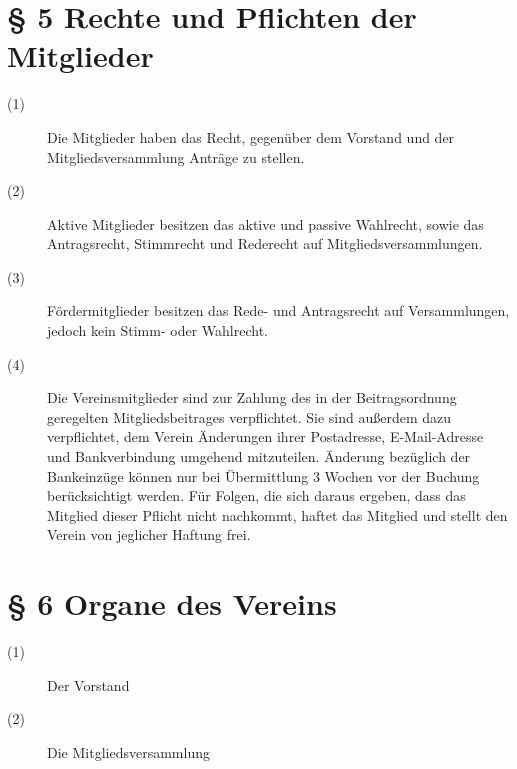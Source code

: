 \documentclass[a4paper,12pt]{scrartcl}
\begin{document}
\section*{\S{} 5 Rechte und Pflichten der Mitglieder}
\begin{description} 

\item[(1)] Die Mitglieder haben das Recht, gegenüber dem Vorstand und der Mitgliedsversammlung Anträge zu stellen.
\item[(2)] Aktive Mitglieder besitzen das aktive und passive Wahlrecht, sowie das Antragsrecht, Stimmrecht und Rederecht auf Mitgliedsversammlungen.
\item[(3)] Fördermitglieder besitzen das Rede- und Antragsrecht auf Versammlungen, jedoch kein Stimm- oder Wahlrecht.
\item[(4)] Die Vereinsmitglieder sind zur Zahlung des in der Beitragsordnung geregelten Mitgliedsbeitrages verpflichtet. Sie sind außerdem dazu verpflichtet, dem Verein Änderungen ihrer Postadresse, E-Mail-Adresse und Bankverbindung umgehend mitzuteilen. Änderung bezüglich der Bankeinzüge können nur bei Übermittlung 3 Wochen vor der Buchung berücksichtigt werden. Für Folgen, die sich daraus ergeben, dass das Mitglied dieser Pflicht nicht nachkommt, haftet das Mitglied und stellt den Verein von jeglicher Haftung frei.

\end{description}



\section*{\S{} 6 Organe des Vereins}
\begin{description} 

\item[(1)] Der Vorstand
\item[(2)] Die Mitgliedsversammlung

\end{description}
\end{document}
